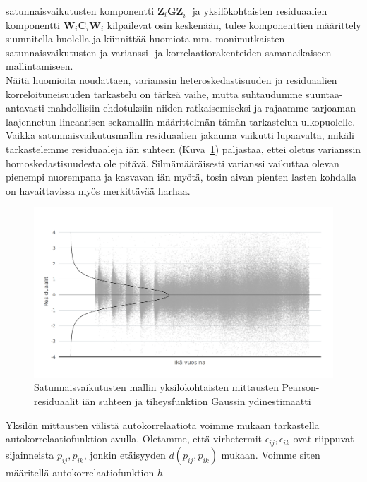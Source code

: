 \documentclass[finnish]{docopts}
\begin{document}
satunnaisvaikutusten komponentti $\bm{Z}_i \bm{G} \bm{Z}_i^\top$ ja yksilökohtaisten residuaalien komponentti $\bm{W}_i \bm{C}_i \bm{W}_i$ kilpailevat osin keskenään, tulee komponenttien määrittely suunnitella huolella ja kiinnittää huomiota mm. monimutkaisten satunnaisvaikutusten ja varianssi- ja korrelaatiorakenteiden samanaikaiseen mallintamiseen.\\

Näitä huomioita noudattaen, varianssin heteroskedastisuuden ja residuaalien korreloituneisuuden tarkastelu on tärkeä vaihe, mutta suhtaudumme suuntaa-antavasti mahdollisiin ehdotuksiin niiden ratkaisemiseksi ja rajaamme \cite{pinheiro00} tarjoaman laajennetun lineaarisen sekamallin määrittelmän tämän tarkastelun ulkopuolelle.\\

Vaikka satunnaisvaikutusmallin residuaalien jakauma vaikutti lupaavalta, mikäli tarkastelemme residuaaleja iän suhteen (Kuva~\ref{fig:lme2_ika_resid}) paljastaa, ettei oletus varianssin homoskedastisuudesta ole pitävä. Silmämääräisesti varianssi vaikuttaa olevan pienempi nuorempana ja kasvavan iän myötä, tosin aivan pienten lasten kohdalla on havaittavissa myös merkittävää harhaa.\\

\begin{figure}[H]
\centering
  \includegraphics[scale=0.8]{kuvaajat/lme2_ika_residuaalit.png}
  \caption{Satunnaisvaikutusten mallin yksilökohtaisten mittausten Pearson-residuaalit iän suhteen ja tiheysfunktion Gaussin ydinestimaatti}
  \label{fig:lme2_ika_resid}
\end{figure}

Yksilön mittausten välistä autokorrelaatiota voimme \cite{pinheiro00} mukaan tarkastella autokorrelaatiofunktion avulla. Oletamme, että virhetermit $\epsilon_{ij}, \epsilon_{ik}$ ovat riippuvat sijainneista $p_{ij}, p_{ik}$, jonkin etäisyyden $d(p_{ij}, p_{ik})$ mukaan. Voimme siten määritellä autokorrelaatiofunktion $h$
\end{document}
